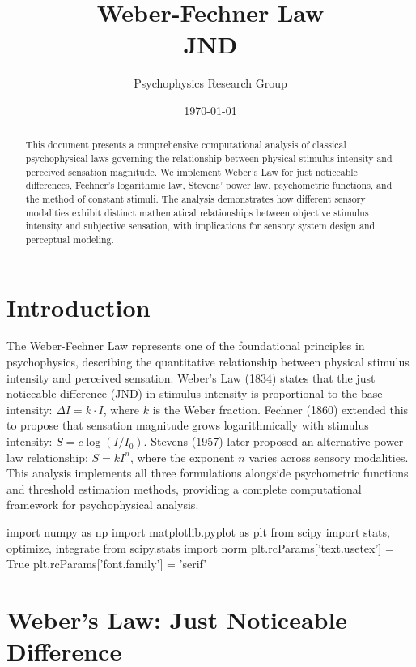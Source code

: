 \documentclass[11pt,a4paper]{article}
\title{Weber-Fechner Law\\JND}
\author{Psychophysics Research Group}
\date{\today}
\begin{document}
\maketitle

\begin{abstract}
This document presents a comprehensive computational analysis of classical psychophysical laws governing the relationship between physical stimulus intensity and perceived sensation magnitude. We implement Weber's Law for just noticeable differences, Fechner's logarithmic law, Stevens' power law, psychometric functions, and the method of constant stimuli. The analysis demonstrates how different sensory modalities exhibit distinct mathematical relationships between objective stimulus intensity and subjective sensation, with implications for sensory system design and perceptual modeling.
\end{abstract}

\section{Introduction}

The Weber-Fechner Law represents one of the foundational principles in psychophysics, describing the quantitative relationship between physical stimulus intensity and perceived sensation. Weber's Law (1834) states that the just noticeable difference (JND) in stimulus intensity is proportional to the base intensity: $\Delta I = k \cdot I$, where $k$ is the Weber fraction. Fechner (1860) extended this to propose that sensation magnitude grows logarithmically with stimulus intensity: $S = c \log(I/I_0)$. Stevens (1957) later proposed an alternative power law relationship: $S = k I^n$, where the exponent $n$ varies across sensory modalities. This analysis implements all three formulations alongside psychometric functions and threshold estimation methods, providing a complete computational framework for psychophysical analysis.

\begin{pycode}

import numpy as np
import matplotlib.pyplot as plt
from scipy import stats, optimize, integrate
from scipy.stats import norm
plt.rcParams['text.usetex'] = True
plt.rcParams['font.family'] = 'serif'

\end{pycode}

\section{Weber's Law: Just Noticeable Difference}
\end{document}
